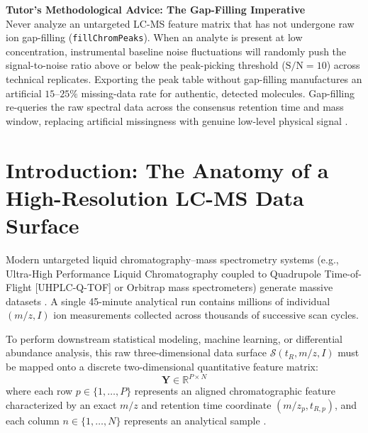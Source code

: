 \documentclass[11pt,twoside,openright]{book}
\begin{document}
\begin{notebox}
\textbf{Tutor's Methodological Advice: The Gap-Filling Imperative}\\
Never analyze an untargeted LC-MS feature matrix that has not undergone raw ion gap-filling (\texttt{fillChromPeaks}). When an analyte is present at low concentration, instrumental baseline noise fluctuations will randomly push the signal-to-noise ratio above or below the peak-picking threshold ($\text{S/N} = 10$) across technical replicates. Exporting the peak table without gap-filling manufactures an artificial $15$--$25\%$ missing-data rate for authentic, detected molecules. Gap-filling re-queries the raw spectral data across the consensus retention time and mass window, replacing artificial missingness with genuine low-level physical signal \cite{smith2006xcms, benton2015evaluating}.
\end{notebox}

\section{Introduction: The Anatomy of a High-Resolution LC-MS Data Surface}

Modern untargeted liquid chromatography--mass spectrometry systems (e.g., Ultra-High Performance Liquid Chromatography coupled to Quadrupole Time-of-Flight [UHPLC-Q-TOF] or Orbitrap mass spectrometers) generate massive datasets \cite{patti2012metabolomics, aebersold2016mass, want2010global, forcisi2015liquid, boland2023health}. A single 45-minute analytical run contains millions of individual $(m/z, I)$ ion measurements collected across thousands of successive scan cycles.

To perform downstream statistical modeling, machine learning, or differential abundance analysis, this raw three-dimensional data surface $\mathcal{S}(t_R, m/z, I)$ must be mapped onto a discrete two-dimensional quantitative feature matrix:
\begin{equation}
\mathbf{Y} \in \mathbb{R}^{P \times N}
\end{equation}
where each row $p \in \{1, \dots, P\}$ represents an aligned chromatographic feature characterized by an exact $m/z$ and retention time coordinate $(m/z_p, t_{R, p})$, and each column $n \in \{1, \dots, N\}$ represents an analytical sample \cite{mclean2021metabolomics}.
\end{document}
